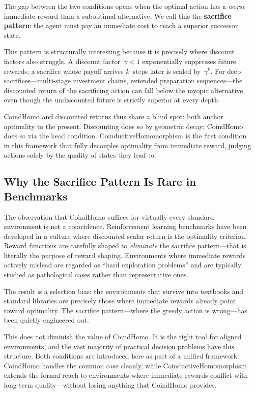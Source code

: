 \documentclass[9pt,a4paper]{article}
\theoremstyle{plain}
\theoremstyle{definition}
\theoremstyle{remark}
\begin{document}
The gap between the two conditions opens when the optimal action has a \emph{worse} immediate reward than a suboptimal alternative.  We call this the \textbf{sacrifice pattern}: the agent must pay an immediate cost to reach a superior successor state.

This pattern is structurally interesting because it is precisely where discount factors also struggle.  A discount factor~$\gamma < 1$ exponentially suppresses future rewards; a sacrifice whose payoff arrives $k$~steps later is scaled by~$\gamma^k$.  For deep sacrifices---multi-stage investment chains, extended preparation sequences---the discounted return of the sacrificing action can fall below the myopic alternative, even though the undiscounted future is strictly superior at every depth.

CoindHomo and discounted returns thus share a blind spot: both anchor optimality to the present.  Discounting does so by geometric decay; CoindHomo does so via the head condition.  CoinductiveHomomorphism is the first condition in this framework that fully decouples optimality from immediate reward, judging actions solely by the quality of states they lead to.

\subsection{Why the Sacrifice Pattern Is Rare in Benchmarks}

The observation that CoindHomo suffices for virtually every standard environment is not a coincidence.  Reinforcement learning benchmarks have been developed in a culture where discounted scalar return is the optimality criterion.  Reward functions are carefully shaped to \emph{eliminate} the sacrifice pattern---that is literally the purpose of reward shaping.  Environments where immediate rewards actively mislead are regarded as ``hard exploration problems'' and are typically studied as pathological cases rather than representative ones.

The result is a selection bias: the environments that survive into textbooks and standard libraries are precisely those where immediate rewards already point toward optimality.  The sacrifice pattern---where the greedy action is wrong---has been quietly engineered out.

This does not diminish the value of CoindHomo.  It is the right tool for aligned environments, and the vast majority of practical decision problems have this structure.  Both conditions are introduced here as part of a unified framework: CoindHomo handles the common case cleanly, while CoinductiveHomomorphism extends the formal reach to environments where immediate rewards conflict with long-term quality---without losing anything that CoindHomo provides.
\end{document}

